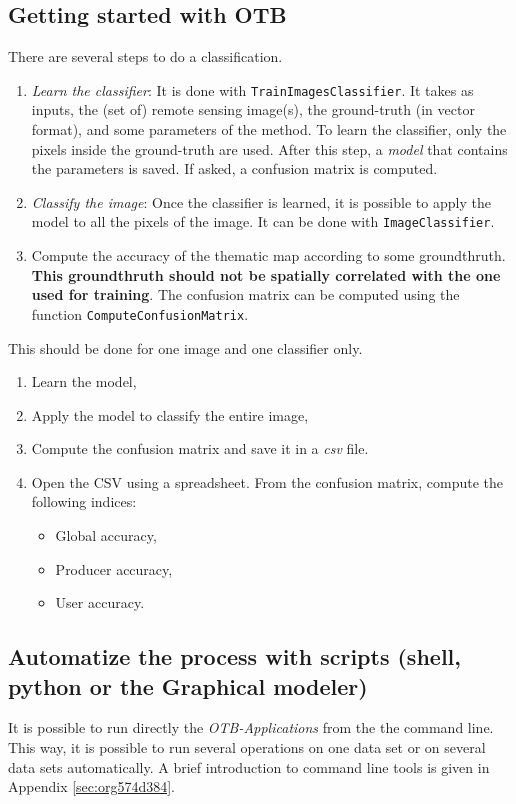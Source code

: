 \documentclass[a4paper,11pt,DIV=18]{scrartcl}
\begin{document}
\subsection{Getting started with OTB}
\label{sec:org62302ea}
There are several steps to do a classification.
\begin{enumerate}
\item \emph{Learn   the    classifier}:   It    is   done    with
\texttt{TrainImagesClassifier}.   It takes  as inputs,  the (set  of) remote
sensing  image(s), the  ground-truth (in  vector format),  and some
parameters of the method.  To learn the classifier, only the pixels
inside the  ground-truth are  used. After this  step, a  \emph{model} that
contains the parameters  is saved. If asked, a  confusion matrix is
computed.
\item \emph{Classify the image}: Once the  classifier is learned, it is possible
to apply the model to all the  pixels of the image.  It can be done
with \texttt{ImageClassifier}.
\item Compute the  accuracy of  the  thematic map  according to  some
groundthruth. \textbf{This groundthruth should  not be spatially correlated
with  the one  used  for  training}.  The  confusion  matrix can  be
computed using the function \texttt{ComputeConfusionMatrix}.
\end{enumerate}


\begin{work}
This should be done for one image and one classifier only.
\begin{enumerate}
\item Learn the model,
\item Apply the model to classify the entire image,
\item Compute the confusion matrix and save it in a \emph{csv} file.
\item Open  the CSV  using a spreadsheet.   From the  confusion matrix,
compute the following indices:
\begin{itemize}
\item Global accuracy,
\item Producer accuracy,
\item User accuracy.
\end{itemize}
\end{enumerate}
\end{work}

\subsection{Automatize the process with scripts (shell, python or the Graphical modeler)}
\label{sec:org065086f}
It  is possible  to run  directly  the \emph{OTB-Applications}  from the  the
command line.  This way, it is  possible to run several  operations on
one  data  set  or  on  several  data  sets  automatically.   A  brief
introduction to command line tools is given in Appendix \ref{sec:org574d384}.
\end{document}
